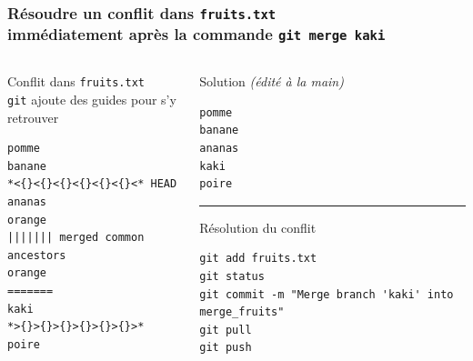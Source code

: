 \documentclass[table,tikz,12pt,svgnames]{beamer}
\begin{document}
\begin{frame}[fragile]
\frametitle{Résoudre un conflit dans \texttt{fruits.txt}\\
\small immédiatement après la commande \texttt{git merge kaki}}
\begin{adjustwidth}{0cm}{-0.8cm}{}
	\begin{columns}[T] %
		\begin{column}{.55\textwidth}
			\color{darkgreen}%
			\noindent
			Conflit dans \texttt{fruits.txt} \\ {\footnotesize\texttt{git} ajoute des guides pour s'y retrouver}
			\color{black}
			\begin{verbatim}
pomme
banane
*<{}<{}<{}<{}<{}<{}<* HEAD
ananas
orange
||||||| merged common ancestors
orange
=======
kaki
*>{}>{}>{}>{}>{}>{}>*
poire
		\end{verbatim}
		\end{column}%
		\begin{column}{.5\textwidth}
			\color{darkgreen}%
			Solution \textit{(édité à la main)}
			\color{black}
			\begin{verbatim}
pomme
banane
ananas
kaki
poire
			\end{verbatim}
\color{gray}\rule{\linewidth}{3pt}
\color{darkgreen}%
Résolution du conflit
\color{black}
			\begin{verbatim}
git add fruits.txt
git status
git commit -m "Merge branch 'kaki' into merge_fruits"
git pull
git push
			\end{verbatim}
		\end{column}%
	\end{columns}
\end{adjustwidth}
\end{frame}
\end{document}
